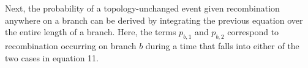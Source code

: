 \documentclass[11pt]{article}
\begin{document}

\noindent Next, the probability of a topology-unchanged event given recombination 
anywhere on a branch can be derived by integrating the previous equation 
over the entire length of a branch.
Here, the terms $p_{b,1}$ and $p_{b,2}$ correspond to recombination occurring
on branch $b$ during a time that falls into either of the two cases in equation 11.%

\end{document}
